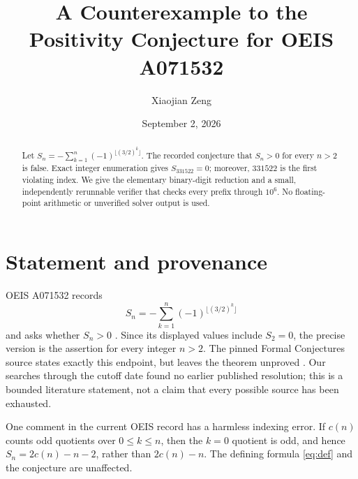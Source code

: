 \documentclass[10pt]{amsart}
\title{A Counterexample to the Positivity Conjecture for OEIS A071532}
\author{Xiaojian Zeng}
\date{September 2, 2026}
\begin{document}
\begin{abstract}
Let $S_n=-\sum_{k=1}^n(-1)^{\lfloor(3/2)^k\rfloor}$.
The recorded conjecture that $S_n>0$ for every $n>2$ is false. Exact
integer enumeration gives $S_{331522}=0$; moreover, $331522$ is the first
violating index. We give the elementary binary-digit reduction and a small,
independently rerunnable verifier that checks every prefix through $10^6$.
No floating-point arithmetic or unverified solver output is used.
\end{abstract}
\maketitle
\section{Statement and provenance}
OEIS A071532 records
\begin{equation}\label{eq:def}
 S_n=-\sum_{k=1}^n(-1)^{\lfloor(3/2)^k\rfloor}
\end{equation}
and asks whether $S_n>0$ \cite{oeis71532}. Since its displayed values include
$S_2=0$, the precise version is the assertion for every integer $n>2$.
The pinned Formal Conjectures source states exactly this endpoint, but leaves
the theorem unproved \cite{formal71532}. Our searches through the cutoff date
found no earlier published resolution; this is a bounded literature statement,
not a claim that every possible source has been exhausted.

One comment in the current OEIS record has a harmless indexing error. If
$c(n)$ counts odd quotients over $0\leq k\leq n$, then the $k=0$ quotient is
odd, and hence $S_n=2c(n)-n-2$, rather than $2c(n)-n$. The defining formula
\eqref{eq:def} and the conjecture are unaffected.
\end{document}
